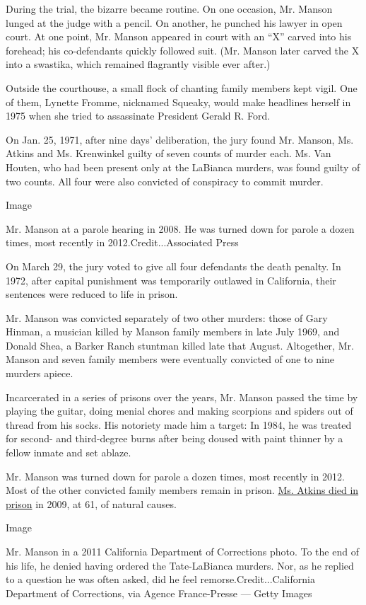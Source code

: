 During the trial, the bizarre became routine. On one occasion, Mr.
Manson lunged at the judge with a pencil. On another, he punched his
lawyer in open court. At one point, Mr. Manson appeared in court with an
``X'' carved into his forehead; his co-defendants quickly followed suit.
(Mr. Manson later carved the X into a swastika, which remained
flagrantly visible ever after.)

Outside the courthouse, a small flock of chanting family members kept
vigil. One of them, Lynette Fromme, nicknamed Squeaky, would make
headlines herself in 1975 when she tried to assassinate President Gerald
R. Ford.

On Jan. 25, 1971, after nine days' deliberation, the jury found Mr.
Manson, Ms. Atkins and Ms. Krenwinkel guilty of seven counts of murder
each. Ms. Van Houten, who had been present only at the LaBianca murders,
was found guilty of two counts. All four were also convicted of
conspiracy to commit murder.

Image

Mr. Manson at a parole hearing in 2008. He was turned down for parole a
dozen times, most recently in 2012.Credit...Associated Press

On March 29, the jury voted to give all four defendants the death
penalty. In 1972, after capital punishment was temporarily outlawed in
California, their sentences were reduced to life in prison.

Mr. Manson was convicted separately of two other murders: those of Gary
Hinman, a musician killed by Manson family members in late July 1969,
and Donald Shea, a Barker Ranch stuntman killed late that August.
Altogether, Mr. Manson and seven family members were eventually
convicted of one to nine murders apiece.

Incarcerated in a series of prisons over the years, Mr. Manson passed
the time by playing the guitar, doing menial chores and making scorpions
and spiders out of thread from his socks. His notoriety made him a
target: In 1984, he was treated for second- and third-degree burns after
being doused with paint thinner by a fellow inmate and set ablaze.

Mr. Manson was turned down for parole a dozen times, most recently in
2012. Most of the other convicted family members remain in prison.
\href{http://www.nytimes3xbfgragh.onion/2009/09/26/us/26atkins.html}{Ms.
Atkins died in prison} in 2009, at 61, of natural causes.

Image

Mr. Manson in a 2011 California Department of Corrections photo. To the
end of his life, he denied having ordered the Tate-LaBianca murders.
Nor, as he replied to a question he was often asked, did he feel
remorse.Credit...California Department of Corrections, via Agence
France-Presse --- Getty Images

